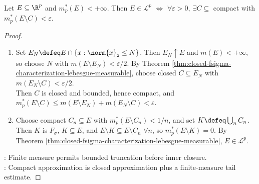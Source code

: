 \begin{theorem} \label{thm:compact-characterization-finite-outer-measure} \\
Let $E\subseteq\R^p$ and $m_p^\ast(E)<+\infty$. Then $E\in\mathcal{L}^p$ $\Longleftrightarrow$ $\forall\varepsilon>0,\ \exists C\subseteq$ compact with $m_p^\ast(E\setminus C)<\varepsilon$.
\begin{proof}
\begin{enumerate}[label=\roman*.]
\setlength{\itemsep}{0pt}
\item[$(\Rightarrow)$] Set $E_N\defeq E\cap\{x:\norm{x}_2\leq N\}$. Then $E_N\uparrow E$ and $m(E)<+\infty$, so choose $N$ with $m(E\setminus E_N)<\varepsilon/2$. By Theorem \ref{thm:closed-fsigma-characterization-lebesgue-measurable}, choose closed $C\subseteq E_N$ with $m(E_N\setminus C)<\varepsilon/2$.\\
Then $C$ is closed and bounded, hence compact, and $m_p^\ast(E\setminus C)\leq m(E\setminus E_N)+m(E_N\setminus C)<\varepsilon$.
\item[$(\Leftarrow)$] Choose compact $C_n\subseteq E$ with $m_p^\ast(E\setminus C_n)<1/n$, and set $K\defeq\bigcup_nC_n$.\\
Then $K$ is $F_\sigma$, $K\subseteq E$, and $E\setminus K\subseteq E\setminus C_n$ $\forall n$, so $m_p^\ast(E\setminus K)=0$. By Theorem \ref{thm:closed-fsigma-characterization-lebesgue-measurable}, $E\in\mathcal{L}^p$.
\end{enumerate}
: Finite measure permits bounded truncation before inner closure.\\
: Compact approximation is closed approximation plus a finite-measure tail estimate.
\end{proof}
\end{theorem}

